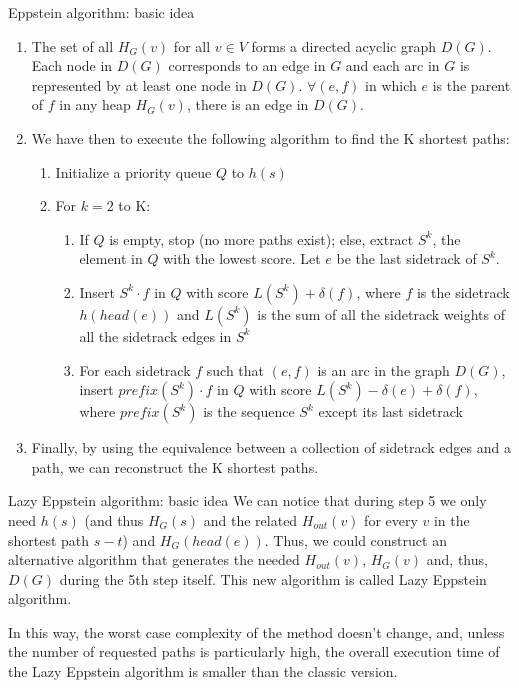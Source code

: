 \begin{frame}[allowframebreaks]{Eppstein algorithm: basic idea}
\begin{enumerate}
        \framebreak
        
        \item The set of all $H_G(v)$ for all $v \in V$ forms a directed acyclic graph $D(G)$. Each node in $D(G)$ corresponds to an edge in $G$ and each arc in $G$ is represented by at least one node in $D(G)$. $\forall (e,f)$ in which $e$ is the parent of $f$ in any heap $H_G(v)$, there is an edge in $D(G)$.
        \item We have then to execute the following algorithm to find the K shortest paths:
        \begin{enumerate}
            \item Initialize a priority queue $Q$ to ${h(s)}$
            \item For $k = 2$ to K:
            \begin{enumerate}
                \item If $Q$ is empty, stop (no more paths exist); else, extract $S^k$, the element in $Q$ with the lowest score. Let $e$ be the last sidetrack of $S^k$.
                \item Insert $S^k \cdot f$ in $Q$ with score $L(S^k) + \delta(f)$, where $f$ is the sidetrack $h(head(e))$ and $L(S^k)$ is the sum of all the sidetrack weights of all the sidetrack edges in $S^k$
                \item For each sidetrack $f$ such that $(e,f)$ is an arc in the graph $D(G)$, insert $prefix(S^k) \cdot f$ in $Q$ with score $L(S^k)-\delta(e)+\delta(f)$, where $prefix(S^k)$ is the sequence $S^k$ except its last sidetrack
            \end{enumerate}
        \end{enumerate}
        \item Finally, by using the equivalence between a collection of sidetrack edges and a path, we can reconstruct the K shortest paths.
    \end{enumerate}
\end{frame}

\begin{frame}{Lazy Eppstein algorithm: basic idea}
    We can notice that during step 5 we only need $h(s)$ (and thus $H_G(s)$ and the related $H_{out}(v)$ for every $v$ in the shortest path $s-t$) and $H_G(head(e))$. Thus, we could construct an alternative algorithm that generates the needed $H_{out}(v)$, $H_G(v)$ and, thus, $D(G)$ during the 5th step itself. This new algorithm is called Lazy Eppstein algorithm.

    
    In this way, the worst case complexity of the method doesn't change, and, unless the number of requested paths is particularly high, the overall execution time of the Lazy Eppstein algorithm is smaller than the classic version.
\end{frame}

